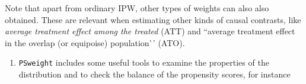 \documentclass[
]{book}
\newenvironment{Shaded}{\begin{snugshade}}{\end{snugshade}}
\newcommand{\AttributeTok}[1]{\textcolor[rgb]{0.13,0.29,0.53}{#1}}
\newcommand{\CommentTok}[1]{\textcolor[rgb]{0.56,0.35,0.01}{\textit{#1}}}
\newcommand{\ConstantTok}[1]{\textcolor[rgb]{0.56,0.35,0.01}{#1}}
\newcommand{\DecValTok}[1]{\textcolor[rgb]{0.00,0.00,0.81}{#1}}
\newcommand{\FunctionTok}[1]{\textcolor[rgb]{0.13,0.29,0.53}{\textbf{#1}}}
\newcommand{\NormalTok}[1]{#1}
\newcommand{\OtherTok}[1]{\textcolor[rgb]{0.56,0.35,0.01}{#1}}
\newcommand{\SpecialCharTok}[1]{\textcolor[rgb]{0.81,0.36,0.00}{\textbf{#1}}}
\newcommand{\StringTok}[1]{\textcolor[rgb]{0.31,0.60,0.02}{#1}}
\providecommand{\tightlist}{%
  \setlength{\itemsep}{0pt}\setlength{\parskip}{0pt}}
\begin{document}
\begin{Shaded}
\end{Shaded}

Note that apart from ordinary IPW,
other types of weights can also also obtained. These
are relevant when estimating other kinds of causal contrasts,
like \emph{average treatment effect among the treated} (ATT) and ``average
treatment effect in the overlap (or equipoise) population'\,' (ATO).

\begin{enumerate}
\def\labelenumi{\arabic{enumi}.}
\setcounter{enumi}{1}
\tightlist
\item
  \texttt{PSweight} includes some useful tools to examine the
  properties of the distribution and to check the
  balance of the propensity scores, for instance
\end{enumerate}
\end{document}
